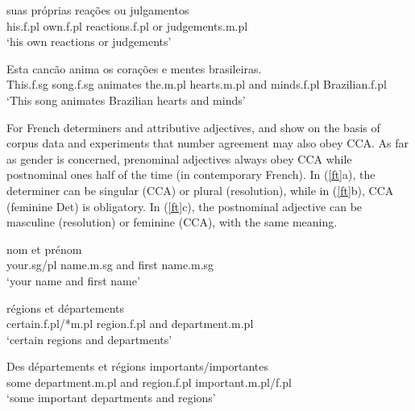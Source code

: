 \documentclass[output=paper]{langsci/langscibook}
\begin{document}
\begin{exe}
 \ex
\begin{xlista}
\ex \gll suas pr\'{o}prias rea\c{c}\~{o}es ou julgamentos \\
his.{\sc f.pl} own.{\sc f.pl} reactions.{\sc f.pl} or judgements.{\sc m.pl} \\
\glt `his own reactions or judgements'\\ 
\citep[435]{Villavicencio:Sadler:ea:05}  


\ex \gll Esta canc\~{a}o anima os cora\c{c}\~{o}es e mentes brasileiras. \\
 This.{\sc f.sg}  song.{\sc f.sg} animates the.{\sc m.pl} hearts.{\sc m.pl} and minds.{\sc f.pl} Brazilian.{\sc f.pl} \\
\glt `This song animates Brazilian hearts and minds'\\
\citep[437]{Villavicencio:Sadler:ea:05} 
\end{xlista} \label{fo}
\end{exe}

For French determiners and attributive adjectives, \citet{An:Abeille:17} and \citet{Abeille:An:Shiraishi:18} show on the basis of corpus data and experiments that number agreement may also obey CCA. As far as gender is concerned, prenominal adjectives always obey CCA while postnominal ones half of the time (in contemporary French). In (\ref{ft}a), the determiner can be singular (CCA) or plural (resolution), while in (\ref{ft}b), CCA (feminine Det) is obligatory. In (\ref{ft}c), the postnominal adjective can be masculine (resolution) or feminine (CCA), with the same meaning.

\begin{exe}
 \ex
\begin{xlista}
\ex  {} nom et pr\'{e}nom \\
your.{sg/pl} name.{\sc m.sg} and first name.{\sc m.sg} \\
\glt `your name and first name'\\ 
\citep{An:Abeille:17}

\ex {} r\'{e}gions et d\'{e}partements \\
certain.{\sc f.pl}/*{\sc m.pl} region.{\sc f.pl} and department.{\sc m.pl} \\
\glt `certain regions and departments'\\ \citep{Abeille:An:Shiraishi:18}

\ex \gll Des d\'{e}partements et r\'{e}gions importants/importantes\\
some department.{\sc m.pl} and region.{\sc f.pl} important.{\sc m.pl}/{\sc f.pl}\\
\glt `some important departments and regions'
\end{xlista}\label{ft}
\end{exe}
\end{document}
